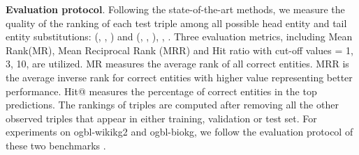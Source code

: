 \documentclass[11pt,a4paper]{article}
\begin{document}
\begin{comment}
\begin{itemize}
\item[]
\textbf{ogbl-wikikg2}\footnote{ogbl-wikikg2 fixes a bug in test/validation negative samples from original ogbl-wikikg.} \cite{hu2020open} is extracted from Wikidata knowledge base \cite {vrandevcic2014wikidata}. One of the main challenges for this dataset is complex relations.
\end{itemize}
\begin{itemize}
\item[]
\textbf{ogbl-biokg} \cite{hu2020open} contains data from a large number of biomedical data repositories. One of the main challenges for this dataset is symmetry relations.
\end{itemize}
\begin{itemize}
\item[]
\textbf{FB15k} \cite{bordes2013translating} contains triples from Freebase.
The main relation patterns are inverse and symmetry/antisymmetry.
\end{itemize}
\begin{itemize}
\item[]
\textbf{FB15k-237} \cite{toutanova2015observed} is a subset of FB15k, with inverse relations removed.
The main relation patterns antisymmetry and composition.
\end{itemize}
\begin{itemize}
\item[]
\textbf{DB100k} \cite{ding2018improving} is a subset of DBpedia.
The main relation patterns are composition and subrelation.
\end{itemize}
\begin{itemize}
\item[]
\textbf{Sports} \cite{wang2015knowledge} is a subset of NELL \cite{mitchell2018never}.
The main relation patterns are antisymmetry and subrelation.
\end{itemize}
\end{comment}

\textbf{Evaluation protocol}. Following the state-of-the-art methods, we measure the quality of the ranking of each test triple among all possible head entity and tail entity substitutions: (,  , ) and (, , ), , .
Three evaluation metrics, including Mean Rank(MR), Mean Reciprocal Rank (MRR) and Hit ratio with cut-off values  = 1, 3, 10, are utilized.
MR measures the average rank of all correct entities.
MRR is the average inverse rank for correct entities with higher value representing better performance.
Hit@ measures the percentage of correct entities in the top  predictions.
The rankings of triples are computed after removing all the other observed triples that appear in either training, validation or test set. For experiments on ogbl-wikikg2 and ogbl-biokg, we follow the evaluation protocol of these two benchmarks \cite{hu2020open}.
\end{document}
